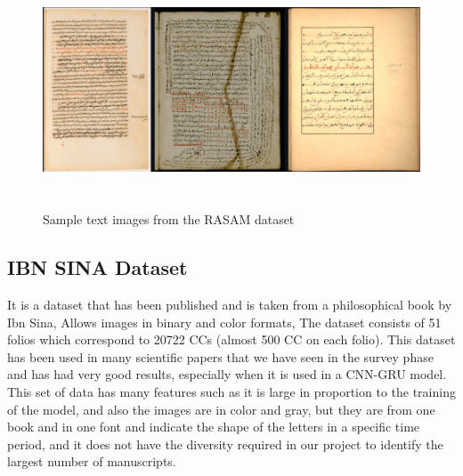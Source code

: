 \begin{figure}[!htb]
    \centering
    \includegraphics[width=12cm , height=7cm]{images/RASAM sample.png}
    \caption{Sample text images from the RASAM dataset}
    \label{fig:RASAM sample dataset}
\end{figure}

\subsection{IBN SINA Dataset}
It is a dataset that has been published and is taken from a philosophical book by Ibn Sina, Allows images in binary and color formats, The dataset consists of 51 folios which correspond to 20722 CCs (almost 500 CC on each folio)\cite{farrahi2010ibn}.
This dataset has been used in many scientific papers that we have seen in the survey phase and has had very good results, especially when it is used in a CNN-GRU model\cite{hassen2021subword}.
This set of data has many features such as it is large in proportion to the training of the model, and also the images are in color and gray, but they are from one book and in one font and indicate the shape of the letters in a specific time period, and it does not have the diversity required in our project to identify the largest number of manuscripts.


